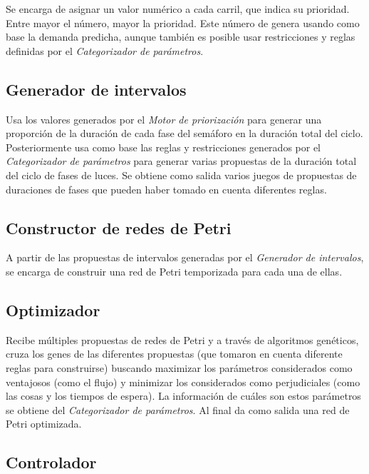 Se encarga de asignar un valor numérico a cada carril, que indica su
prioridad. Entre mayor el número, mayor la prioridad. Este número de
genera usando como base la demanda predicha, aunque también es posible
usar restricciones y reglas definidas por el \emph{Categorizador de
parámetros}.

\hypertarget{generador-de-intervalos}{%
\subsection{Generador de intervalos}\label{generador-de-intervalos}}

Usa los valores generados por el \emph{Motor de priorización} para
generar una proporción de la duración de cada fase del semáforo en la
duración total del ciclo. Posteriormente usa como base las reglas y
restricciones generados por el \emph{Categorizador de parámetros} para
generar varias propuestas de la duración total del ciclo de fases de
luces. Se obtiene como salida varios juegos de propuestas de duraciones
de fases que pueden haber tomado en cuenta diferentes reglas.

\hypertarget{constructor-de-redes-de-petri}{%
\subsection{Constructor de redes de
Petri}\label{constructor-de-redes-de-petri}}

A partir de las propuestas de intervalos generadas por el
\emph{Generador de intervalos}, se encarga de construir una red de Petri
temporizada para cada una de ellas.

\hypertarget{optimizador}{%
\subsection{Optimizador}\label{optimizador}}

Recibe múltiples propuestas de redes de Petri y a través de algoritmos
genéticos, cruza los genes de las diferentes propuestas (que tomaron en
cuenta diferente reglas para construirse) buscando maximizar los
parámetros considerados como ventajosos (como el flujo) y minimizar los
considerados como perjudiciales (como las cosas y los tiempos de
espera). La información de cuáles son estos parámetros se obtiene del
\emph{Categorizador de parámetros}. Al final da como salida una red de
Petri optimizada.

\hypertarget{controlador}{%
\subsection{Controlador}\label{controlador}}


